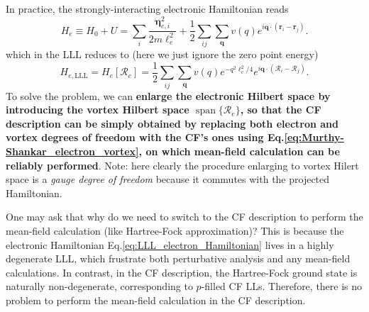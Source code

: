 In practice, the strongly-interacting electronic Hamiltonian reads
\begin{equation*}
    H_e\equiv H_0+U=\sum_i\frac{\bm\eta_{e,i}^2}{2m \ell_e^2}+\frac{1}{2}\sum_{ij}\sum_{\bm q}v(q)e^{i\bm q\cdot(\bm r_i-\bm r_j)}.
\end{equation*}
which in the LLL reduces to (here we just ignore the zero point energy)
\begin{equation}\label{eq:LLL_electron_Hamiltonian}
    H_{e,\text{LLL}}=H_e[\bm{\mathcal R}_e]=\dfrac{1}{2}\sum_{ij}\sum_{\bm q}v(q)e^{-q^2\ell_e^2/4} e^{i\bm q\cdot(\bm{\mathcal R}_i-\bm{\mathcal R}_j)}.
\end{equation}
To solve the problem, we can \textbf{enlarge the electronic Hilbert space by introducing the vortex Hilbert space $\mathop{\mathrm{span}}\{\bm{\mathcal R}_e\}$, so that the CF description can be simply obtained by replacing both electron and vortex degrees of freedom with the CF's ones using Eq.\eqref{eq:Murthy-Shankar_electron_vortex}, on which mean-field calculation can be reliably performed}. Note: here clearly the procedure enlarging to vortex Hilert space is a \emph{gauge degree of freedom} because it commutes with the projected Hamiltonian.

One may ask that why do we need to switch to the CF description to perform the mean-field calculation (like Hartree-Fock approximation)? This is because the electronic Hamiltonian Eq.\eqref{eq:LLL_electron_Hamiltonian} lives in a highly degenerate LLL, which frustrate both perturbative analysis and any mean-field calculations. In contrast, in the CF description, the Hartree-Fock ground state is naturally non-degenerate, corresponding to $p$-filled CF LLs. Therefore, there is no problem to perform the mean-field calculation in the CF description.


